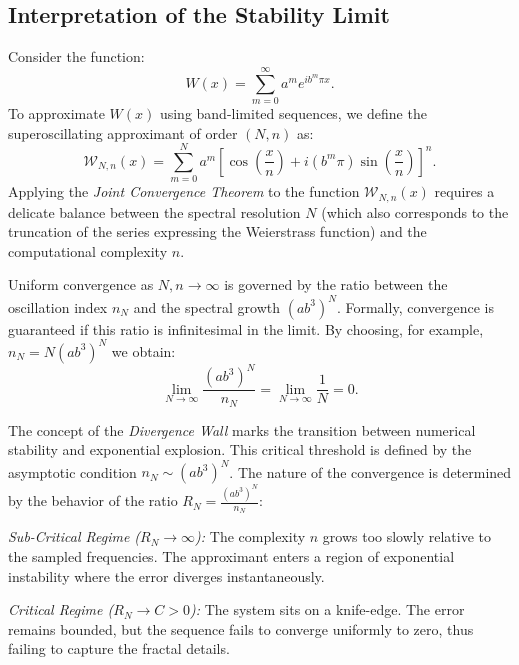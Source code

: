 \documentclass[reqno,11pt]{amsart}
\theoremstyle{definition}
\begin{document}
\subsection{Interpretation of the Stability Limit}

Consider the function:
\begin{equation} \label{eq:weierstrass}
    W(x) = \sum_{m=0}^{\infty} a^m e^{i b^m \pi x}.
\end{equation}
To approximate $W(x)$ using band-limited sequences, we define the superoscillating approximant of order $(N, n)$ as:
\begin{equation} \label{eq:super_weierstrass_def}
     \mathcal{W}_{N, n}(x)= \sum_{m=0}^{N} a^m \left[ \cos\left(\frac{x}{n}\right) + i (b^m \pi) \sin\left(\frac{x}{n}\right) \right]^n.
\end{equation}
Applying the \textit{Joint Convergence Theorem} to the function $\mathcal{W}_{N, n}(x)$ requires a delicate balance between the spectral resolution $N$ (which also corresponds to the truncation of the series expressing the Weierstrass function) and the computational complexity $n$.

Uniform convergence as $N, n \to \infty$ is governed by the ratio between the oscillation index $n_N$ and the spectral growth $(ab^3)^N$. Formally, convergence is guaranteed if this ratio is infinitesimal in the limit. By choosing, for example, $n_N = N(ab^3)^N$ we obtain:
\begin{equation} \label{eq:experiment_condition}
    \lim_{N \to \infty} \frac{(ab^3)^N}{n_N} = \lim_{N \to \infty} \frac{1}{N} = 0.
\end{equation}



The concept of the \textit{Divergence Wall} marks the transition between numerical stability and exponential explosion. This critical threshold is defined by the asymptotic condition $n_N \sim (ab^3)^N$. The nature of the convergence is determined by the behavior of the ratio $R_N = \frac{(ab^3)^N}{n_N}$:

\medskip
 {\em Sub-Critical Regime ($R_N \to \infty$):} The complexity $n$ grows too slowly relative to the sampled frequencies. The approximant enters a region of exponential instability where the error diverges instantaneously.

\medskip
{\em Critical Regime ($R_N \to C > 0$):} The system sits on a knife-edge. The error remains bounded, but the sequence fails to converge uniformly to zero, thus failing to capture the fractal details.
\end{document}
